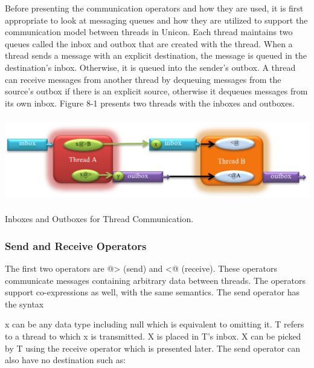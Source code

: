 Before presenting the communication operators and how they are used, it
is first appropriate to look at messaging queues and how they are
utilized to support the communication model between threads in Unicon.
Each thread maintains two queues called the inbox and outbox that are
created with the thread. When a thread sends a message with an explicit
destination, the message is queued in the destination{\textquoteright}s
inbox. Otherwise, it is queued into the sender{\textquoteright}s outbox.
A thread can receive messages from another thread by dequeuing messages
from the source{\textquoteright}s outbox if there is an explicit
source, otherwise it dequeues messages from its own inbox.  Figure 8-1
presents two threads with the inboxes and outboxes.

\bigskip


\begin{center}
\includegraphics[width=5.75in,height=1.45in]{ub-img/thread-fig1.png}
\end{center}
\vspace{-0.25cm}{\sffamily\bfseries Figure 8-1:}
{\sffamily Inboxes and Outboxes for Thread Communication.}

\bigskip

\subsubsection{Send and Receive Operators}

The first two operators are \textsf{@{\textgreater}} (send)
and \textsf{{\textless}@} (receive). These operators
communicate messages containing arbitrary data between threads. The
operators support co-expressions as well, with the same semantics. The
send operator has the syntax 


\textsf{x} can be any data type including null which is
equivalent to omitting it. \textsf{T} refers to a thread to
which \textsf{x} is transmitted. \textsf{X} is
placed in \textsf{T}{\textquoteright}s inbox.
\textsf{X} can be picked by \textsf{T} using the
receive operator which is presented later. The send operator can also
have no destination such as:

